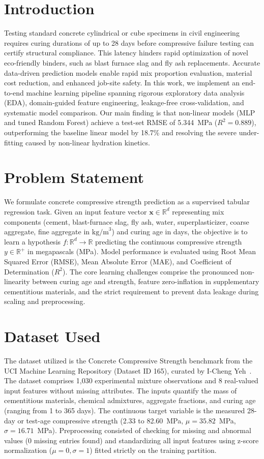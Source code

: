 \documentclass[conference]{IEEEtran}
\begin{document}
\section{Introduction}
Testing standard concrete cylindrical or cube specimens in civil engineering requires curing durations of up to 28 days before compressive failure testing can certify structural compliance. This latency hinders rapid optimization of novel eco-friendly binders, such as blast furnace slag and fly ash replacements. Accurate data-driven prediction models enable rapid mix proportion evaluation, material cost reduction, and enhanced job-site safety. In this work, we implement an end-to-end machine learning pipeline spanning rigorous exploratory data analysis (EDA), domain-guided feature engineering, leakage-free cross-validation, and systematic model comparison. Our main finding is that non-linear models (MLP and tuned Random Forest) achieve a test-set RMSE of 5.344~MPa ($R^2 = 0.889$), outperforming the baseline linear model by 18.7\% and resolving the severe under-fitting caused by non-linear hydration kinetics.

\section{Problem Statement}
We formulate concrete compressive strength prediction as a supervised tabular regression task. Given an input feature vector $\mathbf{x} \in \mathbb{R}^d$ representing mix components (cement, blast-furnace slag, fly ash, water, superplasticizer, coarse aggregate, fine aggregate in $\text{kg/m}^3$) and curing age in days, the objective is to learn a hypothesis $f: \mathbb{R}^d \to \mathbb{R}$ predicting the continuous compressive strength $y \in \mathbb{R}^+$ in megapascals (MPa). Model performance is evaluated using Root Mean Squared Error (RMSE), Mean Absolute Error (MAE), and Coefficient of Determination ($R^2$). The core learning challenges comprise the pronounced non-linearity between curing age and strength, feature zero-inflation in supplementary cementitious materials, and the strict requirement to prevent data leakage during scaling and preprocessing.

\section{Dataset Used}
The dataset utilized is the Concrete Compressive Strength benchmark from the UCI Machine Learning Repository (Dataset ID 165), curated by I-Cheng Yeh~\cite{yeh1998}. The dataset comprises 1,030 experimental mixture observations and 8 real-valued input features without missing attributes. The inputs quantify the mass of cementitious materials, chemical admixtures, aggregate fractions, and curing age (ranging from 1 to 365 days). The continuous target variable is the measured 28-day or test-age compressive strength (2.33 to 82.60~MPa, $\mu = 35.82$~MPa, $\sigma = 16.71$~MPa). Preprocessing consisted of checking for missing and abnormal values (0 missing entries found) and standardizing all input features using z-score normalization ($\mu = 0, \sigma = 1$) fitted strictly on the training partition.
\end{document}
